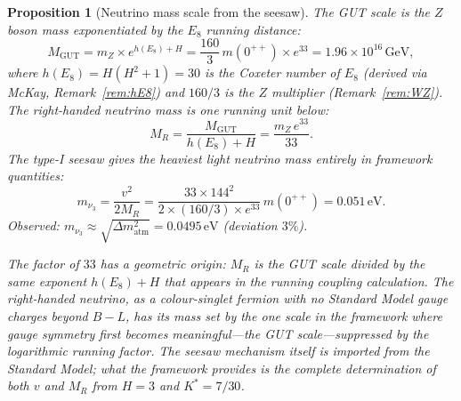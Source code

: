 \documentclass[11pt,a4paper]{article}
\newtheorem{proposition}[theorem]{Proposition}
\theoremstyle{definition}
\theoremstyle{remark}
\begin{document}
\begin{proposition}[Neutrino mass scale from the seesaw]\label{conj:neutrinos}
The GUT scale is the $Z$ boson mass exponentiated by the $E_8$ running distance:
\begin{equation}\label{eq:M_GUT}
M_\mathrm{GUT} = m_Z\times e^{h(E_8)+H} = \frac{160}{3}\,m(0^{++})\times e^{33} = 1.96\times 10^{16}\,\mathrm{GeV},
\end{equation}
where $h(E_8)=H(H^2+1)=30$ is the Coxeter number of $E_8$ (derived via McKay, Remark~\ref{rem:hE8}) and $160/3$ is the $Z$ multiplier (Remark~\ref{rem:WZ}). The right-handed neutrino mass is one running unit below:
\begin{equation}\label{eq:M_R}
M_R = \frac{M_\mathrm{GUT}}{h(E_8)+H} = \frac{m_Z\,e^{33}}{33}.
\end{equation}
The type-I seesaw gives the heaviest light neutrino mass entirely in framework quantities:
\begin{equation}\label{eq:neutrino_mass}
m_{\nu_3} = \frac{v^2}{2M_R} = \frac{33\times 144^2}{2\times(160/3)\times e^{33}}\,m(0^{++}) = 0.051\,\mathrm{eV}.
\end{equation}
Observed: $m_{\nu_3}\approx\sqrt{\Delta m^2_\mathrm{atm}}=0.0495\,\mathrm{eV}$ (deviation $3\%$).

The factor of $33$ has a geometric origin: $M_R$ is the GUT scale divided by the same exponent $h(E_8)+H$ that appears in the running coupling calculation. The right-handed neutrino, as a colour-singlet fermion with no Standard Model gauge charges beyond $B-L$, has its mass set by the one scale in the framework where gauge symmetry first becomes meaningful---the GUT scale---suppressed by the logarithmic running factor. The seesaw mechanism itself is imported from the Standard Model; what the framework provides is the complete determination of both $v$ and $M_R$ from $H=3$ and $K^*=7/30$.


\end{proposition}
\end{document}
